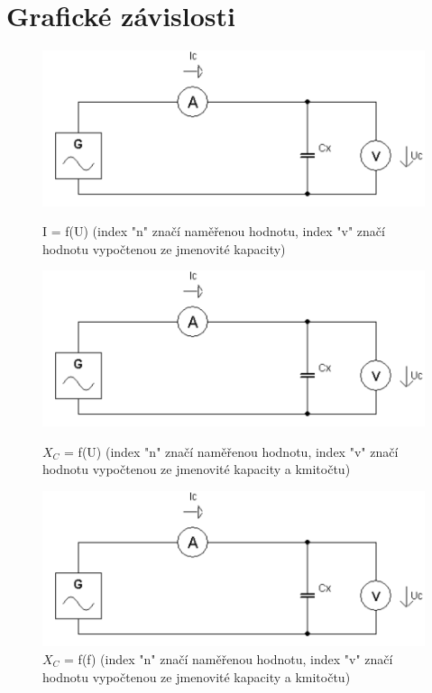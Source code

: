\documentclass[a4paper,12pt]{report}
\begin{document}
\chapter*{Grafické závislosti}
\begin{figure}[htp]
	\begin{center}
		\includegraphics[scale=0.5]{ELM_27_11_23@2.png}
		\caption{ I = f(U) (index "n" značí naměřenou hodnotu, index "v" značí hodnotu vypočtenou ze jmenovité kapacity)}
		
		\includegraphics[scale=0.5]{ELM_27_11_23@2.png}
		\caption{ $X_C$ = f(U) (index "n" značí naměřenou hodnotu, index "v" značí hodnotu vypočtenou ze jmenovité kapacity a kmitočtu)}
		
		\includegraphics[scale=0.5]{ELM_27_11_23@2.png}
		\caption{ $X_C$ = f(f) (index "n" značí naměřenou hodnotu, index "v" značí hodnotu vypočtenou ze jmenovité kapacity a kmitočtu)}
	\end{center}
\end{figure}
\newpage
\end{document}
